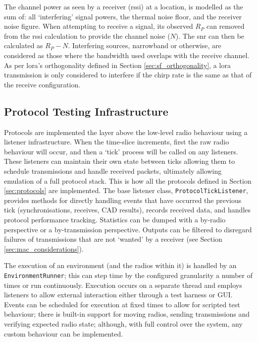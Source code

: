 The channel power as seen by a receiver (\ac{rssi}) at a location, is modelled as the sum of: all `interfering' signal powers, the thermal noise floor, and the receiver noise figure. When attempting to receive a signal, its observed $R_P$ can removed from the \ac{rssi} calculation to provide the channel noise ($N$). The \ac{snr} can then be calculated as $R_P - N$. Interfering sources, narrowband or otherwise, are considered as those where the bandwidth used overlaps with the receive channel. As per \ac{lora}'s orthogonality defined in Section \ref{sec:sf_orthogonality}, a \ac{lora} transmission is only considered to interfere if the chirp rate is the same as that of the receive configuration.


\subsection{Protocol Testing Infrastructure}
Protocols are implemented the layer above the low-level radio behaviour using a listener infrastructure. When the time-slice increments, first the raw radio behaviour will occur, and then a `tick' process will be called on any listeners. These listeners can maintain their own state between ticks allowing them to schedule transmissions and handle received packets, ultimately allowing emulation of a full protocol stack. This is how all the protocols defined in Section \ref{sec:protocols} are implemented. The base listener class, \texttt{ProtocolTickListener}, provides methods for directly handling events that have occurred the previous tick (synchronisations, receives, CAD results), records received data, and handles protocol performance tracking. Statistics can be dumped with a by-radio perspective or a by-transmission perspective. Outputs can be filtered to disregard failures of transmissions that are not `wanted' by a receiver (see Section \ref{sec:mac_considerations}).

The execution of an environment (and the radios within it) is handled by an \texttt{EnvironmentRunner}; this can step time by the configured granularity a number of times or run continuously. Execution occurs on a separate thread and employs listeners to allow external interaction either through a test harness or GUI. Events can be scheduled for execution at fixed times to allow for scripted test behaviour; there is built-in support for moving radios, sending transmissions and verifying expected radio state; although, with full control over the system, any custom behaviour can be implemented. 


